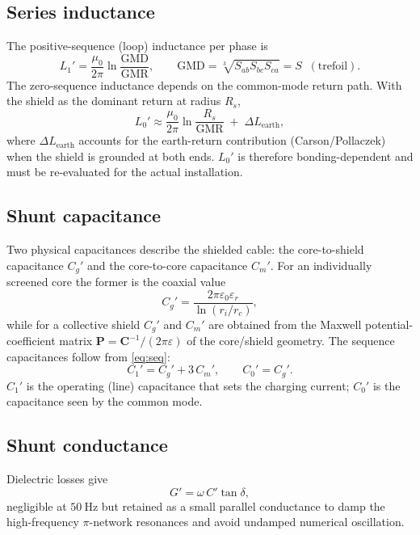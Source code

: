 \documentclass[11pt,a4paper,oneside]{book}
\newcommand{\Cmat}{\bm{C}}
\begin{document}
\begin{onehalfspace}
\begin{appendices}
\subsection{Series inductance}
The positive-sequence (loop) inductance per phase is
\begin{equation}
	L_1'=\frac{\mu_0}{2\pi}\ln\!\frac{\mathrm{GMD}}{\mathrm{GMR}},
	\qquad \mathrm{GMD}=\sqrt[3]{S_{ab}S_{bc}S_{ca}}=S \;\;(\text{trefoil}).
	\label{eq:l1}
\end{equation}
The zero-sequence inductance depends on the common-mode return path. With the
shield as the dominant return at radius $R_s$,
\begin{equation}
	L_0'\approx\frac{\mu_0}{2\pi}\ln\!\frac{R_s}{\mathrm{GMR}}
	\;+\;\Delta L_{\mathrm{earth}},
	\label{eq:l0}
\end{equation}
where $\Delta L_{\mathrm{earth}}$ accounts for the earth-return contribution
(Carson/Pollaczek) when the shield is grounded at both ends. $L_0'$ is therefore
bonding-dependent and must be re-evaluated for the actual installation.

\subsection{Shunt capacitance}
Two physical capacitances describe the shielded cable: the core-to-shield
capacitance $C_g'$ and the core-to-core capacitance $C_m'$. For an individually
screened core the former is the coaxial value
\begin{equation}
	C_g'=\frac{2\pi\varepsilon_0\varepsilon_r}{\ln(r_i/r_c)} ,
	\label{eq:cg}
\end{equation}
while for a collective shield $C_g'$ and $C_m'$ are obtained from the Maxwell
potential-coefficient matrix $\bm{P}=\Cmat^{-1}/(2\pi\varepsilon)$ of the
core/shield geometry. The sequence capacitances follow from \eqref{eq:seq}:
\begin{equation}
	C_1'=C_g'+3\,C_m', \qquad C_0'=C_g'.
	\label{eq:cseq}
\end{equation}
$C_1'$ is the operating (line) capacitance that sets the charging current; $C_0'$
is the capacitance seen by the common mode.

\subsection{Shunt conductance}
Dielectric losses give
\begin{equation}
	G'=\omega\,C'\tan\delta,
	\label{eq:g}
\end{equation}
negligible at $50\ \mathrm{Hz}$ but retained as a small parallel conductance to
damp the high-frequency $\pi$-network resonances and avoid undamped numerical
oscillation.


\end{appendices}
\end{onehalfspace}
\end{document}
